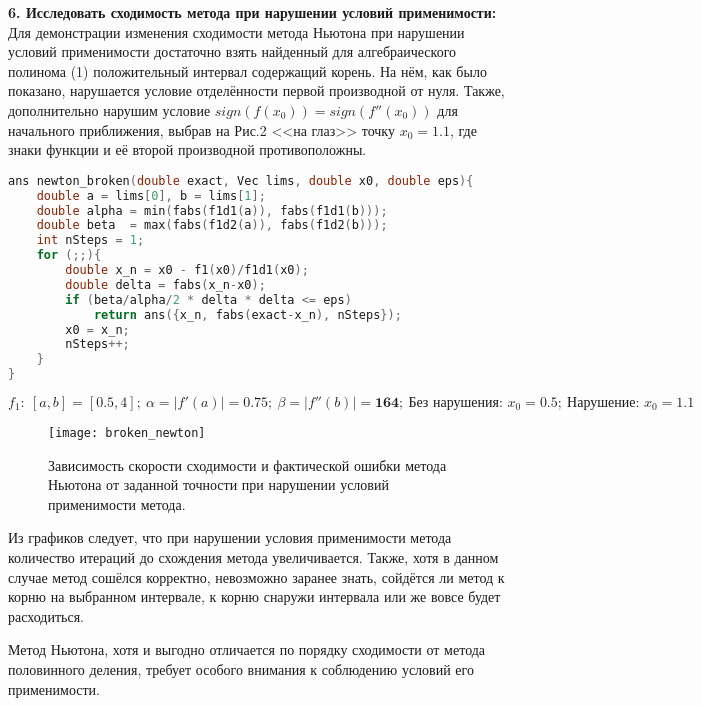 {\Large{\textbf{6. Исследовать сходимость метода при нарушении условий применимости:}}}\\
Для демонстрации изменения сходимости метода Ньютона при нарушении условий применимости достаточно взять найденный  для алгебраического полинома (1) положительный интервал содержащий корень. На нём, как было показано, нарушается условие отделённости первой производной от нуля. Также, дополнительно нарушим условие $sign(f(x_0))=sign(f''(x_0))$ для начального приближения, выбрав на Рис.2 <<на глаз>> точку $x_0=1.1$, где знаки функции и её второй производной противоположны.
\begin{lstlisting}[language=c++, firstnumber=38]
ans newton_broken(double exact, Vec lims, double x0, double eps){
    double a = lims[0], b = lims[1];
    double alpha = min(fabs(f1d1(a)), fabs(f1d1(b)));
    double beta  = max(fabs(f1d2(a)), fabs(f1d2(b)));
    int nSteps = 1;
    for (;;){
        double x_n = x0 - f1(x0)/f1d1(x0);
        double delta = fabs(x_n-x0);
        if (beta/alpha/2 * delta * delta <= eps)
            return ans({x_n, fabs(exact-x_n), nSteps});
        x0 = x_n;
        nSteps++;
    }
}
\end{lstlisting}
\[
    f_1: ~ [a,b] =\mathit{[0.5, 4]}; ~ \alpha=|f'(a)|=\mathbf{0.75}; ~ \beta=|f''(b)|=\mathbf{164}; ~ \text{Без нарушения: }x_0=\mathbf{0.5}; ~ \text{Нарушение: }x_0=\mathbf{1.1}
\]
\begin{figure}[H]
    \centering
    \caption{Зависимость скорости сходимости и фактической ошибки метода Ньютона от заданной точности при нарушении условий применимости метода.}
    \label{fig:pic6}
    \texttt{[image: broken\_newton]}
\end{figure}


Из графиков следует, что при нарушении условия применимости метода количество итераций до схождения метода увеличивается. Также, хотя в данном случае метод сошёлся корректно, невозможно заранее знать, сойдётся ли метод к корню на выбранном интервале, к корню снаружи интервала или же вовсе будет расходиться.

Метод Ньютона, хотя и выгодно отличается по порядку сходимости от метода половинного деления, требует особого внимания к соблюдению условий его применимости.

